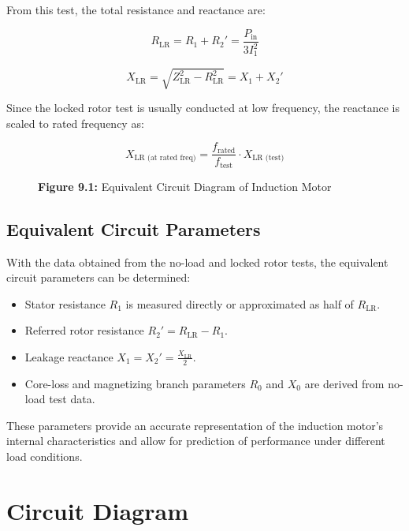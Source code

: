 \documentclass[a4paper,12pt]{article}
\begin{document}
From this test, the total resistance and reactance are:

\begin{equation}
	R_{\text{LR}} = R_1 + R_2' = \frac{P_{\text{in}}}{3 I_1^2}
\end{equation}

\begin{equation}
	X_{\text{LR}} = \sqrt{Z_{\text{LR}}^2 - R_{\text{LR}}^2} = X_1 + X_2'
\end{equation}

Since the locked rotor test is usually conducted at low frequency, the reactance is scaled to rated frequency as:

\begin{equation}
	X_{\text{LR (at rated freq)}} = \frac{f_{\text{rated}}}{f_{\text{test}}} \cdot X_{\text{LR (test)}}
\end{equation}

\begin{figure}[h!]
	\centering
	\caption*{\textbf{Figure 9.1:} Equivalent Circuit Diagram of Induction Motor}
\end{figure}

\subsection{Equivalent Circuit Parameters}
With the data obtained from the no-load and locked rotor tests, the equivalent circuit parameters can be determined:

\begin{itemize}
	\item Stator resistance \( R_1 \) is measured directly or approximated as half of \( R_{\text{LR}} \).
	\item Referred rotor resistance \( R_2' = R_{\text{LR}} - R_1 \).
	\item Leakage reactance \( X_1 = X_2' = \frac{X_{\text{LR}}}{2} \).
	\item Core-loss and magnetizing branch parameters \( R_0 \) and \( X_0 \) are derived from no-load test data.
\end{itemize}

These parameters provide an accurate representation of the induction motor's internal characteristics and allow for prediction of performance under different load conditions.

	
	\newpage
	
	
	\section{Circuit Diagram}
	\begin{figure}[H]
		\centering

		
	\end{figure}
	
\end{document}
